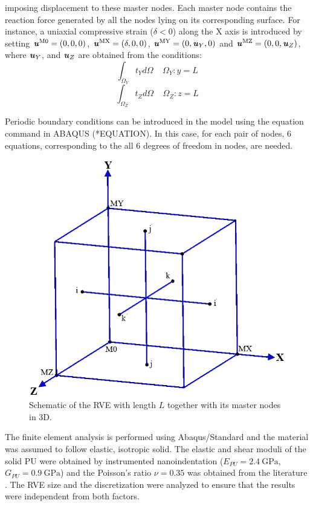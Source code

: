 \documentclass[review]{elsarticle}
\begin{document}
imposing displacement to these master nodes. Each master node contains the reaction force generated by 
all the nodes lying on its corresponding surface. For instance, a uniaxial compressive strain ($\delta<0$) along 
the X axis is introduced by setting $\textbf{\textit{u}}^\mathrm{M0}=(0,0,0)$, $\textbf{\textit{u}}^\mathrm{MX}=(\delta,0,0)$, $\textbf{\textit{u}}^\mathrm{MY}=(0,\textbf{\textit{u}}_Y,0)$ and $\textbf{\textit{u}}^\mathrm{MZ}=(0,0,\textbf{\textit{u}}_Z)$, 
where $\textbf{\textit{u}}_Y$, and $\textbf{\textit{u}}_Z$ are obtained from the conditions: 
\begin{equation}
\int_{\Omega_Y}t_Yd\Omega \ \ \ \ \ \Omega_Y:y=L
\end{equation}
\begin{equation}
\int_{\Omega_Z}t_Zd\Omega \ \ \ \ \ \Omega_Z:z=L
\end{equation}

Periodic boundary conditions can be introduced in the model using the equation command in ABAQUS 
(*EQUATION).  In  this  case, for  each  pair  of  nodes,  6  equations,  corresponding to  the  all  6  degrees  of 
freedom in nodes, are needed. 
\begin{figure}[hb]
  \centering
  \includegraphics[scale=0.6]{PBC}
  \captionsetup{justification=centering}
  \caption[Close up of \textit{Hemidactylus} sp.]
   {Schematic of the RVE with length $L$ together with its master nodes in 3D.}
   \label{fig:PBC}
\end{figure} 
The finite element analysis is performed using Abaqus/Standard and the material was assumed to follow elastic, isotropic solid. The elastic and shear moduli of the solid PU were obtained by instrumented nanoindentation ($E_{PU}=2.4 \ \mathrm{GPa}$, $G_{PU}=0.9 \ \mathrm{GPa}$) and the Poisson's ratio $\nu=0.35$ was obtained from the literature \citep{Mills2007xvii}. The RVE size and the discretization were analyzed to ensure that the results were independent from both factors. 
\end{document}
